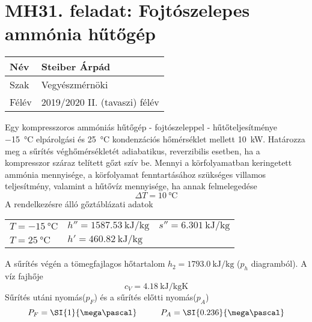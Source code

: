 

\section*{MH31. feladat: Fojtószelepes ammónia hűtőgép}


\begin{tabular}{ | p{2cm} | p{14cm} | } 
	\hline
	Név & Steiber Árpád \\ 
	\hline
	Szak & Vegyészmérnöki \\ 
	\hline
	Félév & 2019/2020 II. (tavaszi) félév \\ 
	\hline
\end{tabular}
\vspace{0.5cm}

\noindent Egy kompresszoros ammóniás hűtőgép - fojtószeleppel - hűtőteljesítménye \SI{-15}{\celsius} elpárolgási és \SI{25}{\celsius} kondenzációs hőmérséklet mellett  \SI{10}{\kilo\watt}. Határozza meg a sűrítés véghőmérsékletét adiabatikus, reverzibilis esetben, ha a kompresszor száraz telített gőzt szív be. Mennyi a körfolyamatban keringetett ammónia mennyisége, a körfolyamat fenntartásához szükséges villamos teljesítmény, valamint a hűtővíz mennyisége, ha annak felmelegedése 
\begin{equation}
\Delta T = \SI{10}{\celsius}
\end{equation} 
\vspace{0.5cm}
\noindent A rendelkezésre álló gőztáblázati adatok
\vspace{0.2cm}
\begin{center}
\begin{tabular}{p{5cm} p{5cm} p{5cm}}
	$T = \SI{-15}{\celsius}$ &
	$h''=\SI{1587.53}{\kilo\joule\per\kilo\gram}$ & 
	$s''= \SI{6.301}{\kilo\joule\per\kilo\gram}$ \\ 
	$T = \SI{25}{\celsius}$ &
	$h'=\SI{460.82}{\kilo\joule\per\kilo\gram}$ 	
\end{tabular}
\end{center}
\noindent A sűrítés végén a tömegfajlagos hőtartalom $h_2=\SI{1793.0}{\kilo\joule\per\kilo\gram}$ ($p_h$ diagramból). 
A víz fajhője
\begin{equation}
c_V=\SI{4.18}{\kilo\joule\per\kilo\gram\kelvin}
\end{equation}	
Sűrítés utáni nyomás($p_F$) és a sűrítés előtti nyomás($p_A$)
\begin{equation}
P_F=\SI{1}{\mega\pascal} \hspace{1 cm}
P_A=\SI{0.236}{\mega\pascal}
\end{equation}

